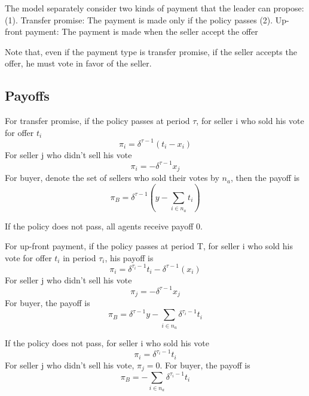\documentclass[ProjectGAZ]{subfiles}
\begin{document}
The model separately consider two kinds of payment that the leader can propose:
(1). Transfer promise: The payment is made only if the policy passes
(2). Up-front payment: The payment is made when the seller accept the offer

Note that, even if the payment type is transfer promise, if the seller accepts the offer, he must vote in favor of the seller. 

\subsection{Payoffs}\label{subsec:CnZ-Payoffs}

For transfer promise, if the policy passes at period $\tau$, for seller i who sold his vote for offer $t_i$
\begin{equation}
	\pi_i = \delta^{\tau-1}(t_i - x_i)
\end{equation}
For seller j who didn't sell his vote
\begin{equation}
	\pi_i = - \delta^{\tau-1}x_j
\end{equation}
For buyer, denote the set of sellers who sold their votes by $n_a$, then the payoff is
\begin{equation}
	\pi_B = \delta^{\tau-1}(y - \sum_{i \in n_a}t_i)
\end{equation}

If the policy does not pass, all agents receive payoff 0.

For up-front payment, if the policy passes at period T, for seller i who sold his vote for offer $t_i$ in period $\tau_i$, his payoff is
\begin{equation}
	\pi_i = \delta^{\tau_i-1}t_i - \delta^{\tau-1}(x_i)
\end{equation}
For seller j who didn't sell his vote
\begin{equation}
	\pi_j = - \delta^{\tau-1}x_j
\end{equation}
For buyer, the payoff is
\begin{equation}
	\pi_B = \delta^{\tau-1}y - \sum_{i \in n_a}\delta^{\tau_i - 1}t_i
\end{equation}

If the policy does not pass, for seller i who sold his vote
\begin{equation}
	\pi_i = \delta^{\tau_i-1}t_i 
\end{equation}
For seller j who didn't sell his vote, $\pi_j = 0$.
For buyer, the payoff is
\begin{equation}
	\pi_B = - \sum_{i \in n_a}\delta^{\tau_i - 1}t_i
\end{equation}
\end{document}
